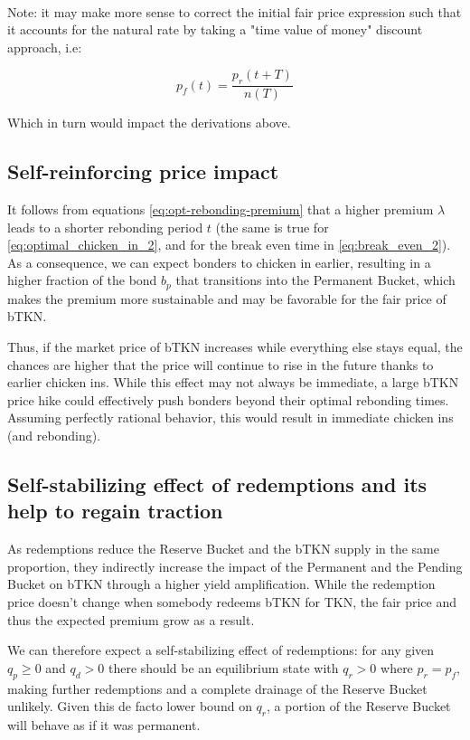 \documentclass{article}
\begin{document}
\paragraph{}

Note: it may make more sense to correct the initial fair price expression such that it accounts for the natural rate by taking a "time value of money" discount approach, i.e:

\begin{equation}
  \label{eq:conservative-1}
p_f(t) = \frac{p_r(t + T)}{n(T)}
\end{equation}

Which in turn would impact the derivations above.

\subsection{Self-reinforcing price impact}
It follows from equations \ref{eq:opt-rebonding-premium} that a higher premium $\lambda$ leads to a shorter rebonding period $t$ (the same is true for \ref{eq:optimal_chicken_in_2}, and for the break even time in \ref{eq:break_even_2}). As a consequence, we can expect bonders to chicken in earlier, resulting in a higher fraction of the bond $b_p$ that transitions into the Permanent Bucket, which makes the premium more sustainable and may be favorable for the fair price of bTKN.

Thus, if the market price of bTKN increases while everything else stays equal, the chances are higher that the price will continue to rise in the future thanks to earlier chicken ins. While this effect may not always be immediate, a large bTKN price hike could effectively push bonders beyond their optimal rebonding times.
Assuming perfectly rational behavior, this would result in immediate chicken ins (and rebonding).

\subsection{Self-stabilizing effect of redemptions and its help to regain traction}
  \label{sec:self-stabilizing}
As redemptions reduce the Reserve Bucket and the bTKN supply in the same proportion, they indirectly increase the impact of the Permanent and the Pending Bucket on bTKN through a higher yield amplification. While the redemption price doesn't change when somebody redeems bTKN for TKN, the fair price and thus the expected premium grow as a result. 

We can therefore expect a self-stabilizing effect of redemptions: for any given $q_p \geq 0$ and $q_d > 0$ there should be an equilibrium state with $q_r > 0$ where $p_r = p_f$, making further redemptions and a complete drainage of the Reserve Bucket unlikely. Given this de facto lower bound on $q_r$, a portion of the Reserve Bucket will behave as if it was permanent.
\end{document}
